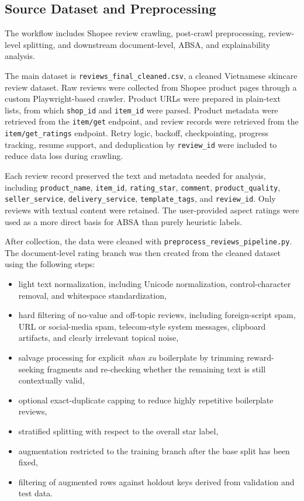 \documentclass[a4paper,12pt]{extarticle}
\begin{document}
\subsection{Source Dataset and Preprocessing}

The workflow includes Shopee review crawling, post-crawl preprocessing, review-level splitting, and downstream document-level, ABSA, and explainability analysis.

The main dataset is \texttt{reviews\_final\_cleaned.csv}, a cleaned Vietnamese skincare review dataset. Raw reviews were collected from Shopee product pages through a custom Playwright-based crawler. Product URLs were prepared in plain-text lists, from which \texttt{shop\_id} and \texttt{item\_id} were parsed. Product metadata were retrieved from the \texttt{item/get} endpoint, and review records were retrieved from the \texttt{item/get\_ratings} endpoint. Retry logic, backoff, checkpointing, progress tracking, resume support, and deduplication by \texttt{review\_id} were included to reduce data loss during crawling.

Each review record preserved the text and metadata needed for analysis, including \texttt{product\_name}, \texttt{item\_id}, \texttt{rating\_star}, \texttt{comment}, \texttt{product\_quality}, \texttt{seller\_service}, \texttt{delivery\_service}, \texttt{template\_tags}, and \texttt{review\_id}. Only reviews with textual content were retained. The user-provided aspect ratings were used as a more direct basis for ABSA than purely heuristic labels.


After collection, the data were cleaned with \texttt{preprocess\_reviews\_pipeline.py}. The document-level rating branch was then created from the cleaned dataset using the following steps:



\begin{itemize}[leftmargin=1.5em]
\item light text normalization, including Unicode normalization, control-character removal, and whitespace standardization,
\item hard filtering of no-value and off-topic reviews, including foreign-script spam, URL or social-media spam, telecom-style system messages, clipboard artifacts, and clearly irrelevant topical noise,
\item salvage processing for explicit \textit{nhan xu} boilerplate by trimming reward-seeking fragments and re-checking whether the remaining text is still contextually valid,
\item optional exact-duplicate capping to reduce highly repetitive boilerplate reviews,
\item stratified splitting with respect to the overall star label,
\item augmentation restricted to the training branch after the base split has been fixed,
\item filtering of augmented rows against holdout keys derived from validation and test data.
\end{itemize}
\end{document}
